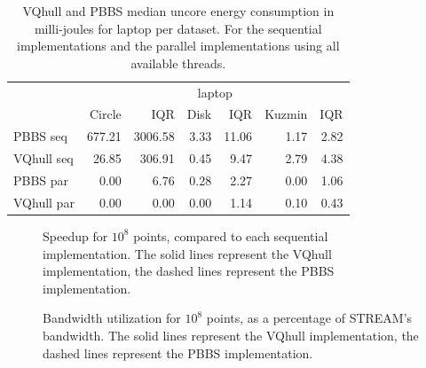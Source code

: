 \documentclass{cas-sc}
\begin{document}
\begin{table}
  \centering
  \begin{tabular}{lrrrrrr}
    & \multicolumn{6}{c}{laptop} \\
    & Circle & IQR & Disk & IQR & Kuzmin & IQR \\\midrule
    PBBS seq & 677.21 & 3006.58 & 3.33 & 11.06 & 1.17 & 2.82 \\
    VQhull seq & 26.85 & 306.91 & 0.45 & 9.47 & 2.79 & 4.38 \\
    PBBS par & 0.00 & 6.76 & 0.28 & 2.27 & 0.00 & 1.06 \\
    VQhull par & 0.00 & 0.00 & 0.00 & 1.14 & 0.10 & 0.43 \\
  \end{tabular}
  \caption{VQhull and PBBS median uncore energy consumption in milli-joules for
  laptop per dataset. For the sequential implementations and the parallel
  implementations using all available threads.}
\end{table}

\begin{figure}
  \scriptsize
  \begin{subfigure}{.333\linewidth}
    \centering
  \end{subfigure}%
  \begin{subfigure}{.333\linewidth}
    \centering
  \end{subfigure}%
  \begin{subfigure}{.333\linewidth}
    \centering
  \end{subfigure}%
  \caption{Speedup for $10^8$ points, compared to each sequential
  implementation. The solid lines represent the VQhull implementation, the
  dashed lines represent the PBBS implementation.}
\end{figure}

\begin{figure}
  \scriptsize
  \begin{subfigure}{.333\linewidth}
    \centering
  \end{subfigure}%
  \begin{subfigure}{.333\linewidth}
    \centering
  \end{subfigure}%
  \begin{subfigure}{.333\linewidth}
    \centering
  \end{subfigure}%
  \caption{Bandwidth utilization for $10^8$ points, as a percentage of STREAM's
  bandwidth. The solid lines represent the VQhull implementation, the dashed
  lines represent the PBBS implementation.}%
\end{figure}
\end{document}
